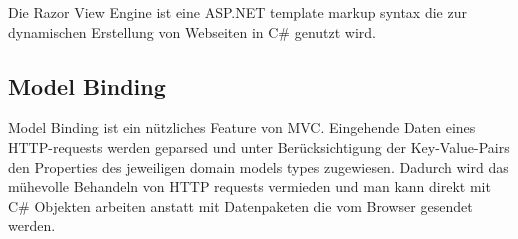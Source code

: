 Die Razor View Engine ist eine ASP.NET template markup syntax die zur dynamischen Erstellung von Webseiten in C\# genutzt wird. \cite{razorengine}


\subsection{Model Binding}

Model Binding ist ein nützliches Feature von MVC. Eingehende Daten eines HTTP-requests werden geparsed und unter Berücksichtigung der Key-Value-Pairs den Properties des jeweiligen domain models types zugewiesen. Dadurch wird das mühevolle Behandeln von HTTP requests vermieden und man kann direkt mit C\# Objekten arbeiten anstatt mit Datenpaketen die vom Browser gesendet werden.


